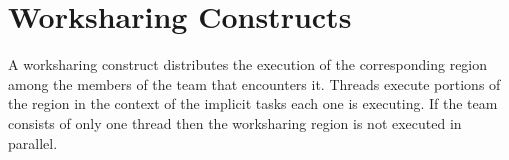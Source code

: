 %
%
%
%
%
%
%
%
%
%
%
%
%


\section{Worksharing Constructs}
\label{sec:Worksharing Constructs}
A worksharing construct distributes the execution of the corresponding region among the
members of the team that encounters it. Threads execute portions of the region in the
context of the implicit tasks each one is executing. If the team consists of only one
thread then the worksharing region is not executed in parallel.

